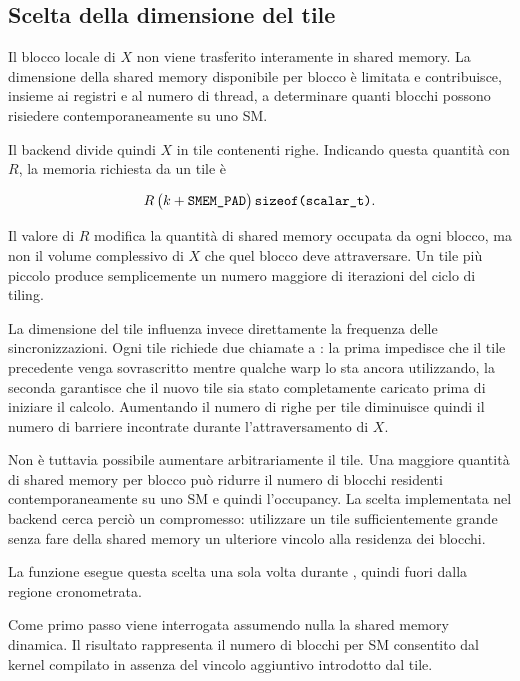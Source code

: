 \subsection{Scelta della dimensione del tile}
\label{sec:piano-tile}

Il blocco locale di $X$ non viene trasferito interamente in shared memory.
La dimensione della shared memory disponibile per blocco è limitata e
contribuisce, insieme ai registri e al numero di thread, a determinare
quanti blocchi possono risiedere contemporaneamente su uno SM.

Il backend divide quindi $X$ in tile contenenti
 righe. Indicando questa quantità con $R$, la
memoria richiesta da un tile è

\[
R\,
\bigl(k+\texttt{SMEM\_PAD}\bigr)\,
\texttt{sizeof(scalar\_t)}.
\]

Il valore di $R$ modifica la quantità di shared memory occupata da ogni
blocco, ma non il volume complessivo di $X$ che quel blocco deve
attraversare. Un tile più piccolo produce semplicemente un numero maggiore
di iterazioni del ciclo di tiling.

La dimensione del tile influenza invece direttamente la frequenza delle
sincronizzazioni. Ogni tile richiede due chiamate a
: la prima impedisce che il tile precedente venga
sovrascritto mentre qualche warp lo sta ancora utilizzando, la seconda
garantisce che il nuovo tile sia stato completamente caricato prima di
iniziare il calcolo. Aumentando il numero di righe per tile diminuisce
quindi il numero di barriere incontrate durante l'attraversamento di $X$.

Non è tuttavia possibile aumentare arbitrariamente il tile. Una maggiore
quantità di shared memory per blocco può ridurre il numero di blocchi
residenti contemporaneamente su uno SM e quindi l'occupancy. La scelta
implementata nel backend cerca perciò un compromesso: utilizzare un tile
sufficientemente grande senza fare della shared memory un ulteriore
vincolo alla residenza dei blocchi.

La funzione  esegue questa scelta una sola volta durante
, quindi fuori dalla regione cronometrata.

Come primo passo viene interrogata
 assumendo nulla la
shared memory dinamica. Il risultato rappresenta il numero di blocchi per
SM consentito dal kernel compilato in assenza del vincolo aggiuntivo
introdotto dal tile.

